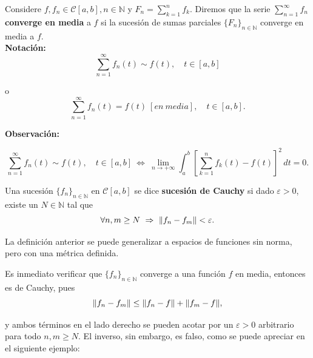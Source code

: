 \begin{defi}
Considere $f, f_n \in \mathcal{C}[a,b], n \in \mathbb{N}$ y $F_n = \sum\limits_{k=1}^n f_k$. Diremos que la serie $\sum\limits_{n=1}^{\infty} f_n$ \textbf{converge en media} a $f$ si la sucesión de sumas parciales $\{F_n\}_{n\in \mathbb{N}}$ converge en media a $f$. 
\\

\textbf{Notación:} 
$$\sum_{n=1}^{\infty} f_n(t) \sim f(t), \quad t \in [a,b]$$

o 
$$\sum_{n=1}^{\infty} f_n(t) = f(t) ~ [en ~media], \quad t \in [a,b].$$
\end{defi}

\textbf{Observación:}  
\begin{shaded}
$$\sum_{n=1}^{\infty} f_n(t) \sim f(t), \quad t \in [a,b] ~\Leftrightarrow~ \lim_{n \to + \infty} \int_a^b \left[ \sum_{k=1}^n f_k(t) - f(t)\right]^2 \, dt = 0.$$ 
\end{shaded}

\begin{defi}
Una sucesión $\{f_n\}_{n \in \mathbb{N}}$ en $\mathcal{C}[a,b]$ se dice \textbf{sucesión de Cauchy} si dado $\varepsilon > 0$, existe un $N \in \mathbb{N}$ tal que 
$$\forall n,m \geq N ~\Rightarrow~ \lVert f_n-f_m\rVert < \varepsilon.$$
\end{defi}

La definición anterior se puede generalizar a espacios de funciones sin norma, pero con una métrica definida.

Es inmediato verificar que $\{f_n\}_{n \in \mathbb{N}}$ converge a una función $f$ en media, entonces es de Cauchy, pues 
$$\lVert f_n - f_m\rVert \leq \lVert f_n - f\rVert + \lVert f_m - f\rVert,$$

y ambos términos en el lado derecho se pueden acotar por un $\varepsilon > 0$ arbitrario para todo $n,m \geq N$. El inverso, sin embargo, es falso, como se puede apreciar en el siguiente ejemplo:

